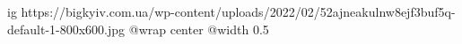  
 
 
 
 

\ifcmt
  ig https://bigkyiv.com.ua/wp-content/uploads/2022/02/52ajneakulnw8ejf3buf5q-default-1-800x600.jpg
	@wrap center
	@width 0.5
\fi
